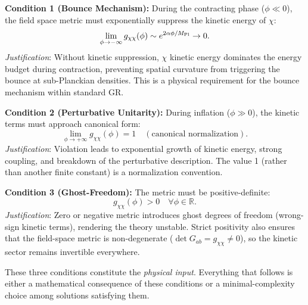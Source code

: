 \documentclass[11pt,a4paper]{article}
\begin{document}
\begin{assumption_box}
\textbf{Condition 1 (Bounce Mechanism):} During the contracting phase ($\phi \ll 0$), the field space metric must exponentially suppress the kinetic energy of $\chi$:
\begin{equation}
\lim_{\phi \to -\infty} g_{\chi\chi}(\phi) \sim e^{2\alpha\phi/M_{\rm Pl}} \to 0.
\label{eq:cond1}
\end{equation}
\textit{Justification}: Without kinetic suppression, $\chi$ kinetic energy dominates the energy budget during contraction, preventing spatial curvature from triggering the bounce at sub-Planckian densities. This is a physical requirement for the bounce mechanism within standard GR.
\end{assumption_box}

\begin{assumption_box}
\textbf{Condition 2 (Perturbative Unitarity):} During inflation ($\phi \gg 0$), the kinetic terms must approach canonical form:
\begin{equation}
\lim_{\phi \to +\infty} g_{\chi\chi}(\phi) = 1 \quad (\text{canonical normalization}).
\label{eq:cond2}
\end{equation}
\textit{Justification}: Violation leads to exponential growth of kinetic energy, strong coupling, and breakdown of the perturbative description. The value 1 (rather than another finite constant) is a normalization convention.
\end{assumption_box}

\begin{assumption_box}
\textbf{Condition 3 (Ghost-Freedom):} The metric must be positive-definite:
\begin{equation}
g_{\chi\chi}(\phi) > 0 \quad \forall \phi \in \mathbb{R}.
\label{eq:cond3}
\end{equation}
\textit{Justification}: Zero or negative metric introduces ghost degrees of freedom (wrong-sign kinetic terms), rendering the theory unstable. Strict positivity also ensures that the field-space metric is non-degenerate ($\det G_{ab} = g_{\chi\chi} \neq 0$), so the kinetic sector remains invertible everywhere.
\end{assumption_box}

These three conditions constitute the \emph{physical input}. Everything that follows is either a mathematical consequence of these conditions or a minimal-complexity choice among solutions satisfying them.

\end{document}
